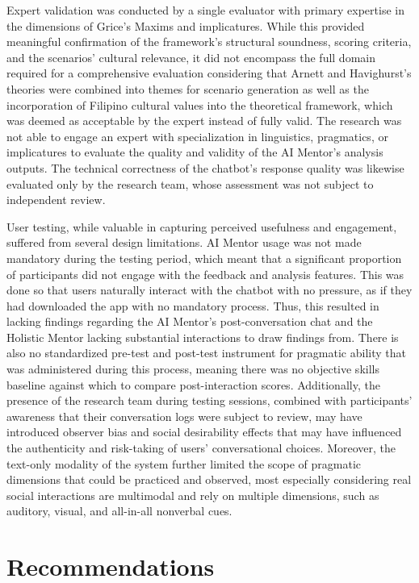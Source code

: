 Expert validation was conducted by a single evaluator with primary expertise in
the dimensions of Grice's Maxims and implicatures.
While this provided meaningful confirmation of the framework's structural soundness, scoring criteria,
and the scenarios' cultural relevance, it did not encompass the full domain
required for a comprehensive evaluation considering that Arnett and Havighurst's theories were combined into
themes for scenario generation as well as the incorporation of Filipino cultural values into the theoretical framework, 
which was deemed as acceptable by the expert instead of fully valid. The research was not able to engage an expert with specialization
in linguistics, pragmatics, or implicatures to evaluate the quality and validity of
the AI Mentor's analysis outputs.  The technical correctness of the chatbot's response quality
was likewise evaluated only by the research team, whose assessment was not
subject to independent review.

User testing, while valuable in capturing perceived usefulness and engagement,
suffered from several design limitations. AI Mentor usage was not made mandatory
during the testing period, which meant that a significant proportion of participants
did not engage with the feedback and analysis features. This was done so that users naturally interact with
the chatbot with no pressure, as if they had downloaded the app with no mandatory process. Thus, this resulted 
in lacking findings regarding the AI Mentor's post-conversation chat and the Holistic Mentor lacking substantial interactions
to draw findings from. There is also no standardized pre-test and post-test instrument for pragmatic ability that was administered
during this process, meaning there was no objective skills baseline against which to compare post-interaction
scores. Additionally, the presence of the research team during testing sessions,
combined with participants' awareness that their conversation logs were subject to
review, may have introduced observer bias and social desirability effects that may have
influenced the authenticity and risk-taking of users' conversational choices. Moreover, the
text-only modality of the system further limited the scope of pragmatic dimensions
that could be practiced and observed, most especially considering real social interactions
are multimodal and rely on multiple dimensions, such as auditory, visual, and all-in-all nonverbal cues.


\section{Recommendations}\label{sec:recommendations}

